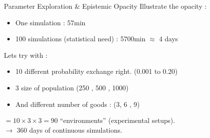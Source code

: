 \documentclass[8pt, handout=show,notes=show]{beamer}
\begin{document}


\begin{frame}{Parameter Exploration \&  Epistemic Opacity}
	Illustrate the opacity :
		\begin{itemize}
			\item 	\alert{One simulation : 57min}
			\item	100 simulations (statistical need) : 5700min $\approx$ 4 days
		\end{itemize}

	Lets try with :
	\begin{itemize}
		\item 	10 different probability exchange right. (0.001 to 0.20)
		\item 	3 size of population (250 , 500 , 1000)
		\item 	And different number of goods : (3, 6 , 9)
	\end{itemize}

	\begin{center}
		$= 10 \times 3 \times 3 = 90 $ ``environments'' (experimental setups).\\
		\vfill
		$\rightarrow$ \alert{360 days of continuous simulations.}


	\end{center}

\end{frame}
\end{document}
